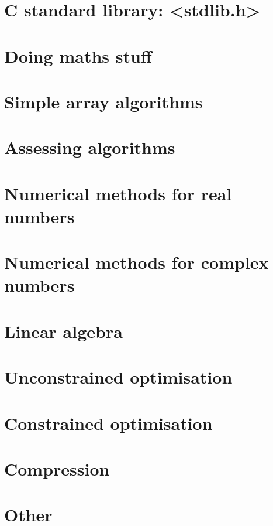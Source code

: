 \documentclass[oneside]{book}
\begin{document}
\part{C standard library: <stdlib.h>}



\part{Doing maths stuff}




\part{Simple array algorithms}






\part{Assessing algorithms}



\part{Numerical methods for real numbers}







\part{Numerical methods for complex numbers}


\part{Linear algebra}









\part{Unconstrained optimisation}





\part{Constrained optimisation}


\part{Compression}


\part{Other}


\end{document}
